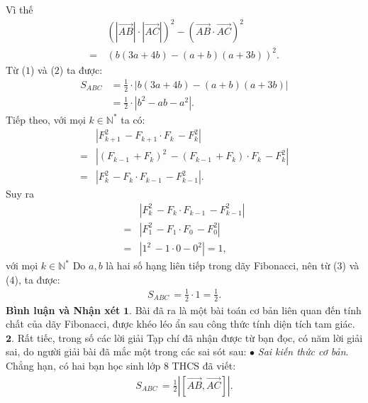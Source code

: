 \begin{multicols}{2}
	Vì thế
	\begin{align*}
		&{\left( {\left| {\overrightarrow {AB} } \right| \cdot \left| {\overrightarrow {AC} } \right|} \right)^2} - {\left( {\overrightarrow {AB}  \cdot \overrightarrow {AC} } \right)^2}\\
		 = \,&{\left( {b\left( {3a + 4b} \right) - \left( {a + b} \right)\left( {a + 3b} \right)} \right)^2}. \tag{$2$}
	\end{align*}
	Từ ($1$) và ($2$) ta được:
	\begin{align*}
		{S_{ABC}} &= \frac{1}{2} \cdot \left| {b\left( {3a + 4b} \right) - \left( {a + b} \right)\left( {a + 3b} \right)} \right| \\
		&= \frac{1}{2} \cdot \left| {{b^2} - ab - {a^2}} \right|. \tag{$3$}
	\end{align*}
	Tiếp theo, với mọi $k \in \mathbb{N^*}$  ta có:
	\begin{align*}
		&\left| {F_{k + 1}^2\, - {F_{k + 1}} \cdot {F_k}\, - F_k^2} \right| \\
		= &\left| {{{\left( {{F_{k - 1}}\, + {F_k}} \right)}^2}\, - \left( {{F_{k - 1}}\, + {F_k}} \right) \cdot {F_k}\, - F_k^2} \right| \\
		= &\left| {F_k^2\, - {F_k} \cdot {F_{k - 1}}\, - F_{k - 1}^2} \right|.
	\end{align*}
	Suy ra
	\begin{align*}
		&\left| {F_k^2\, - {F_k} \cdot {F_{k - 1}}\, - F_{k - 1}^2} \right| \\
		= &\left| {F_1^2\, - {F_1} \cdot {F_0}\, - F_0^2} \right| \\
		= &\left| {{1^2}\, - 1 \cdot 0 - {0^2}} \right| = 1, \tag{$4$}
	\end{align*}
	với mọi $k \in \mathbb{N^*}$
	\vskip 0.05cm 
	Do $a, b$ là hai số hạng liên tiếp trong dãy Fibonacci, nên từ ($3$) và ($4$), ta được:
	\begin{align*}
		{S_{ABC}}\, = \frac{1}{2} \cdot 1 = \frac{1}{2}.
	\end{align*}
	\textbf{\color{thachthuctoanhoc}Bình luận và Nhận xét}
	\vskip 0.05cm
	$\pmb{1.}$ Bài đã ra là một bài toán cơ bản liên quan đến tính chất của dãy Fibonacci, được khéo léo ẩn sau công thức tính diện tích tam giác.
	\vskip 0.05cm
	$\pmb{2.}$ Rất tiếc, trong số các lời giải Tạp chí đã nhận được từ bạn đọc, có năm lời giải sai, do người giải bài đã mắc một trong các sai sót sau:
	\vskip 0.05cm
	$\bullet$ \textit{Sai kiến thức cơ bản}. Chẳng hạn, có hai bạn học sinh lớp 8 THCS đã viết:
	\begin{align*}
		{S_{ABC}}\, = \frac{1}{2}\left| {\left[ {\overrightarrow {AB} ,\overrightarrow {AC} } \right]} \right|.

\end{align*}
\end{multicols}
